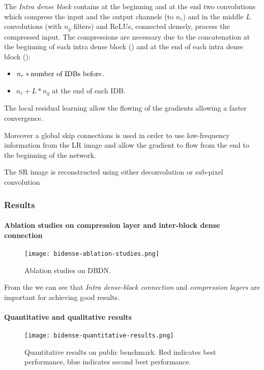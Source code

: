 The \textit{Intra dense block} contains at the beginning and at the end two convolutions which compress the input and the output channels (to $n_r$) and in the middle $L$ convolutions (with $n_g$ filters) and ReLUs, connected densely, process the compressed input.
The compressions are necessary due to the concatenation at the beginning of each intra dense block () and at the end of each intra dense block ():
\begin{itemize}
    \item $n_r \ast \textnormal{number of IDBs before}$.
    \item $n_r + L \ast n_g$ at the end of each IDB. 
\end{itemize}
The local residual learning allow the flowing of the gradients allowing a faster convergence.

Moreover a global skip connections is used in order to use low-frequency information from the LR image and allow the gradient to flow from the end to the beginning of the network.

The SR image is reconstructed using either deconvolution or sub-pixel convolution\cite{subpixelconvolution}

\subsubsection{Results}

\paragraph{Ablation studies on compression layer and inter-block dense connection}
\begin{figure}
    \centering
    \texttt{[image: bidense-ablation-studies.png]}
    \caption{Ablation studies on DBDN.}\label{dbdn-ablation-studies}
\end{figure}
From the  we can see that \textit{Intra dense-block connection} and \textit{compression layers} are important for achieving good results. 

\paragraph{Quantitative and qualitative results}
\begin{figure}
    \centering
    \texttt{[image: bidense-quantitative-results.png]}
    \caption{Quantitative results on public benchmark. Red indicates best performance, blue indicates second best performance.}\label{dbdn:quantitative}
\end{figure}


